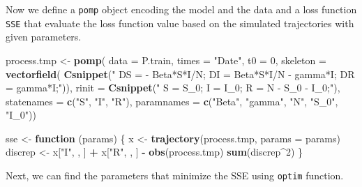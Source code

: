 \documentclass[]{book}
\newenvironment{Shaded}{\begin{snugshade}}{\end{snugshade}}
\newcommand{\KeywordTok}[1]{\textcolor[rgb]{0.13,0.29,0.53}{\textbf{#1}}}
\newcommand{\DataTypeTok}[1]{\textcolor[rgb]{0.13,0.29,0.53}{#1}}
\newcommand{\DecValTok}[1]{\textcolor[rgb]{0.00,0.00,0.81}{#1}}
\newcommand{\StringTok}[1]{\textcolor[rgb]{0.31,0.60,0.02}{#1}}
\newcommand{\ControlFlowTok}[1]{\textcolor[rgb]{0.13,0.29,0.53}{\textbf{#1}}}
\newcommand{\OperatorTok}[1]{\textcolor[rgb]{0.81,0.36,0.00}{\textbf{#1}}}
\newcommand{\NormalTok}[1]{#1}
\begin{document}
Now we define a \texttt{pomp} object encoding the model and the data and
a loss function \texttt{SSE} that evaluate the loss function value based
on the simulated trajectories with given parameters.

\begin{Shaded}
\begin{Highlighting}[]
\NormalTok{process.tmp <-}\StringTok{ }\KeywordTok{pomp}\NormalTok{(}
  \DataTypeTok{data =}\NormalTok{ P.train, }
  \DataTypeTok{times =} \StringTok{"Date"}\NormalTok{, }\DataTypeTok{t0 =} \DecValTok{0}\NormalTok{, }
  \DataTypeTok{skeleton =} \KeywordTok{vectorfield}\NormalTok{(}
    \KeywordTok{Csnippet}\NormalTok{(}\StringTok{"}
\StringTok{               DS = - Beta*S*I/N;}
\StringTok{               DI = Beta*S*I/N - gamma*I;}
\StringTok{               DR = gamma*I;"}\NormalTok{)), }
  \DataTypeTok{rinit =} \KeywordTok{Csnippet}\NormalTok{(}\StringTok{"}
\StringTok{                   S = S_0;}
\StringTok{                   I = I_0;}
\StringTok{                   R = N - S_0 - I_0;"}\NormalTok{), }
  \DataTypeTok{statenames =} \KeywordTok{c}\NormalTok{(}\StringTok{"S"}\NormalTok{, }\StringTok{"I"}\NormalTok{, }\StringTok{"R"}\NormalTok{), }
  \DataTypeTok{paramnames =} \KeywordTok{c}\NormalTok{(}\StringTok{"Beta"}\NormalTok{, }\StringTok{"gamma"}\NormalTok{, }\StringTok{"N"}\NormalTok{, }\StringTok{"S_0"}\NormalTok{, }\StringTok{"I_0"}\NormalTok{))}


\NormalTok{sse <-}\StringTok{ }\ControlFlowTok{function}\NormalTok{ (params) \{}
\NormalTok{  x <-}\StringTok{ }\KeywordTok{trajectory}\NormalTok{(process.tmp, }\DataTypeTok{params =}\NormalTok{ params)}
\NormalTok{  discrep <-}\StringTok{ }\NormalTok{x[}\StringTok{"I"}\NormalTok{, , ] }\OperatorTok{+}\StringTok{ }\NormalTok{x[}\StringTok{"R"}\NormalTok{, , ] }\OperatorTok{-}\StringTok{ }\KeywordTok{obs}\NormalTok{(process.tmp)}
  \KeywordTok{sum}\NormalTok{(discrep}\OperatorTok{^}\DecValTok{2}\NormalTok{)}
\NormalTok{\}}
\end{Highlighting}
\end{Shaded}

Next, we can find the parameters that minimize the SSE using
\texttt{optim} function.
\end{document}
